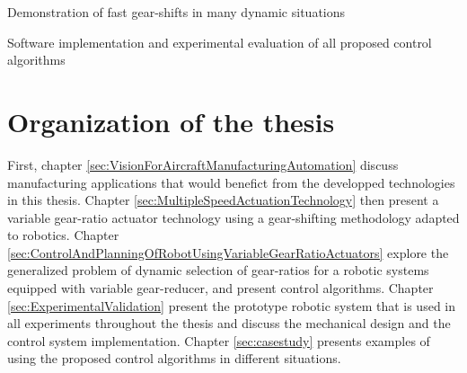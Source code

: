 Demonstration of fast gear-shifts in many dynamic situations

Software implementation and experimental evaluation of all proposed control algorithms


\section{Organization of the thesis}
\label{sec:OrganisationOfTheThesis}

First, chapter \ref{sec:VisionForAircraftManufacturingAutomation} discuss manufacturing applications that would benefict from the developped technologies in this thesis. Chapter \ref{sec:MultipleSpeedActuationTechnology} then present a variable gear-ratio actuator technology using a gear-shifting methodology adapted to robotics. Chapter \ref{sec:ControlAndPlanningOfRobotUsingVariableGearRatioActuators} explore the generalized problem of dynamic selection of gear-ratios for a robotic systems equipped with variable gear-reducer, and present control algorithms. Chapter \ref{sec:ExperimentalValidation} present the prototype robotic system that is used in all experiments throughout the thesis and discuss the mechanical design and the control system implementation. Chapter \ref{sec:casestudy} presents examples of using the proposed control algorithms in different situations.


